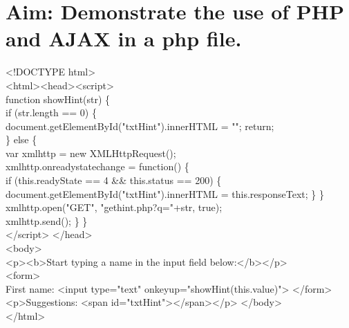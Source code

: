 \section*{\fontsize{16}{14}\selectfont Aim: Demonstrate the use of PHP and AJAX in a php file.}
<!DOCTYPE html>\\
<html><head><script>\\
function showHint(str) \{\\
    if (str.length == 0) \{\\ 
        document.getElementById("txtHint").innerHTML = ""; return;\\
    \} else \{\\
        var xmlhttp = new XMLHttpRequest();\\
        xmlhttp.onreadystatechange = function() \{\\
            if (this.readyState == 4 \&\& this.status == 200) \{\\
                document.getElementById("txtHint").innerHTML = this.responseText; \} \}\\
        xmlhttp.open("GET", "gethint.php?q="+str, true);\\
        xmlhttp.send(); \} \}\\
</script> </head>\\
<body>\\
<p><b>Start typing a name in the input field below:</b></p>\\
<form> \\
First name: <input type="text" onkeyup="showHint(this.value)"> </form>\\
<p>Suggestions: <span id="txtHint"></span></p> </body>\\
</html>\\
